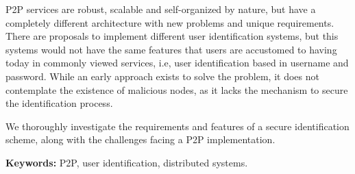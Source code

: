 

P2P services are robust, scalable and self-organized by nature, but have a
completely different architecture with new problems and unique requirements.
There are proposals to implement different user identification systems, but
this systems would not have the same features
 that users are accustomed to having today in commonly
viewed services, i.e, user identification based in username and password. While an
early approach exists to solve the problem, it does not contemplate the existence
of malicious nodes, as it lacks the mechanism to secure the identification
process.

 We thoroughly investigate the requirements and features of a secure
identification scheme, along with the challenges facing a P2P implementation.





{\bf Keywords:} P2P, user identification, distributed systems.
